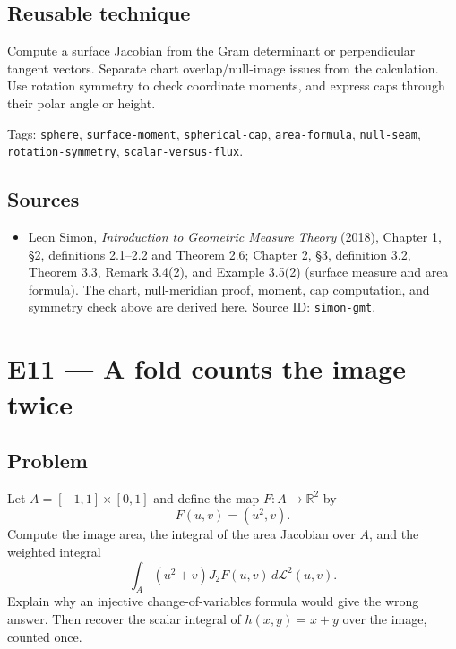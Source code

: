 \documentclass[
  11pt,
]{article}
\providecommand{\tightlist}{%
  \setlength{\itemsep}{0pt}\setlength{\parskip}{0pt}}
\begin{document}
\subsection{Reusable technique}\label{reusable-technique-9}

Compute a surface Jacobian from the Gram determinant or perpendicular
tangent vectors. Separate chart overlap/null-image issues from the
calculation. Use rotation symmetry to check coordinate moments, and
express caps through their polar angle or height.

\begingroup\small\raggedright Tags: \texttt{sphere}, \texttt{surface-\allowbreak{}moment}, \texttt{spherical-\allowbreak{}cap},
\texttt{area-\allowbreak{}formula}, \texttt{null-\allowbreak{}seam}, \texttt{rotation-\allowbreak{}symmetry},
\texttt{scalar-\allowbreak{}versus-\allowbreak{}flux}.\par\endgroup

\subsection{Sources}\label{sources-9}

\begin{itemize}
\tightlist
\item
  Leon Simon,
  \href{https://math.stanford.edu/~lms/ntu-gmt-text.pdf}{\emph{Introduction
  to Geometric Measure Theory} (2018)}, Chapter 1, §2, definitions
  2.1--2.2 and Theorem 2.6; Chapter 2, §3, definition 3.2, Theorem 3.3,
  Remark 3.4(2), and Example 3.5(2) (surface measure and area formula).
  The chart, null-meridian proof, moment, cap computation, and symmetry
  check above are derived here. Source ID: \texttt{simon-\allowbreak{}gmt}.
\end{itemize}

\section{E11 --- A fold counts the image twice}\label{E11}

\subsection{Problem}\label{problem-10}

Let \(A=[-1,1]\times[0,1]\) and define the map \(F:A\to\mathbb R^2\) by
\[
F(u,v)=(u^2,v).
\] Compute the image area, the integral of the area Jacobian over \(A\),
and the weighted integral \[
\int_A (u^2+v)J_2F(u,v)\,d\mathcal L^2(u,v).
\] Explain why an injective change-of-variables formula would give the
wrong answer. Then recover the scalar integral of \(h(x,y)=x+y\) over
the image, counted once.
\end{document}
